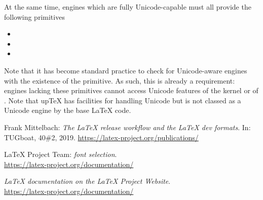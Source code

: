 \documentclass{ltnews}
\begin{document}
At the same time, engines which are fully Unicode-capable must all provide
the following primitives
\begingroup\setlength\columnsep{0pt}
\begin{multicols}{2}
\begin{itemize}
  \item {}
  \item {}
  \item {}
\end{itemize}
\end{multicols}
\endgroup
Note that it has become standard practice to check for Unicode-aware engines
with the existence of the  primitive. As such, this is already
a requirement: engines lacking these primitives cannot access Unicode features
of the \LaTeXe{} kernel or of . Note that up\TeX{} has facilities for
handling Unicode but is not classed as a Unicode engine by the base LaTeX code.

\begin{thebibliography}{9}


 Frank Mittelbach:
  \emph{The
  \LaTeX{} release workflow and the \LaTeX{} dev formats}.
  In: TUGboat, 40\#2, 2019.
  \url{https://latex-project.org/publications/}

 \LaTeX{} Project Team:
  \emph{\LaTeXe{} font selection}.\\
  \url{https://latex-project.org/documentation/}

  \emph{\LaTeX{} documentation on the \LaTeX{} Project Website}.\\
  \url{https://latex-project.org/documentation/}


\end{thebibliography}
\end{document}
